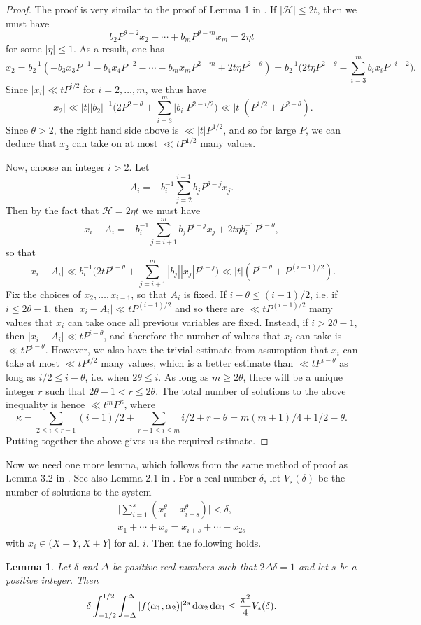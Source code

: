 \documentclass[11pt,reqno]{amsart}
\numberwithin{equation}{section}
\newtheorem{lemma}{Lemma}[section]
\renewcommand{\d}{\,{\rm d}}
\begin{document}
\begin{proof} The proof is very similar to the proof of Lemma 1 in \cite{ArkhZhit}. If $|\mathcal{H}| \leq 2t$, then we must have 
\[ b_2P^{\theta-2}x_2+\cdots+b_mP^{\theta-m}x_m = 2\eta t \]
for some $|\eta| \leq 1$. 
As a result, one has 
\[ x_2 = b_2^{-1}(-b_3x_3P^{-1}-b_4x_4P^{-2}-\cdots-b_mx_mP^{2-m}+2t\eta P^{2-\theta}) = b_2^{-1} \Big( 2t\eta P^{2-\theta} - \sum_{i=3}^m b_ix_iP^{-i+2} \Big). \]
Since $|x_i| \ll tP^{i/2}$ for $i = 2, \ldots, m$, we thus have 
\[ |x_2| \ll |t||b_2|^{-1} \Big( 2P^{2-\theta} + \sum_{i=3}^m |b_i|P^{2-i/2} \Big) \ll |t|(P^{1/2}+P^{2-\theta}). \]
Since $\theta > 2$, the right hand side above is $\ll |t|P^{1/2}$, and so for large $P$, we can deduce that $x_2$ can take on at most $\ll tP^{1/2}$ many values. 

Now, choose an integer $i > 2$. Let 
\[ A_i = -b_i^{-1}\sum_{j = 2}^{i-1} b_jP^{\theta-j}x_j. \]
Then by the fact that $\mathcal{H} = 2\eta t$ we must have 
\[ x_i - A_i = -b_i^{-1}\sum_{j=i+1}^m b_jP^{i-j}x_j +2t\eta b_i^{-1}P^{i-\theta}, \]
so that 
\[ |x_i - A_i| \ll b_i^{-1}\Big( 2tP^{i-\theta} + \sum_{j=i+1}^m |b_j||x_j|P^{i-j} \Big) \ll |t|(P^{i-\theta}+P^{(i-1)/2}). \]
Fix the choices of $x_2, \ldots, x_{i-1}$, so that $A_i$ is fixed. If $i- \theta \leq (i-1)/2$, i.e. if $i \leq 2\theta-1$, then $|x_i -A_i| \ll tP^{(i-1)/2}$ and so there are $\ll tP^{(i-1)/2}$ many values that $x_i$ can take once all previous variables are fixed. Instead, if $i > 2\theta-1$, then $|x_i-A_i| \ll tP^{i-\theta} $, and therefore the number of values that $x_i$ can take is $\ll tP^{i-\theta}$. However, we also have the trivial estimate from assumption that $x_i$ can take at most $\ll tP^{i/2}$ many values, which is a better estimate than $\ll tP^{i-\theta}$ as long as $i/2 \leq i-\theta$, i.e. when $2\theta \leq i$. As long as $m \geq 2\theta$, there will be a unique integer $r$ such that $2\theta-1 < r \leq 2\theta$. The total number of solutions to the above inequality is hence $\ll t^m P^{\kappa}$, where 
\[ \kappa = \sum_{2 \leq i \leq r-1} (i-1)/2+\sum_{r+1 \leq i \leq m} i/2 + r-\theta = m(m+1)/4+1/2 - \theta. \]
Putting together the above gives us the required estimate. 
\end{proof}


Now we need one more lemma, which follows from the same method of proof as Lemma 3.2 in \cite{Poulias1}. See also Lemma 2.1 in \cite{Watt}. For a real number $\delta$, let $V_s(\delta)$ be the number of solutions to the system 
\begin{align*} \Big|\sum_{i=1}^s (x_i^{\theta}-x_{i+s}^{\theta})\Big| < \delta, 
\\ 
x_1+\cdots+x_s = x_{i+s}+\cdots+x_{2s} 
\end{align*} 
with $x_i \in (X-Y,X+Y]$ for all $i$. Then the following holds. 
\begin{lemma} \label{lem:count}
Let $\delta$ and $\Delta$ be positive real numbers such that $2\Delta\delta = 1$ and let $s$ be a positive integer. Then 
\[ \delta \int_{-1/2}^{1/2} \int_{-\Delta}^{\Delta} |f(\alpha_1,\alpha_2)|^{2s} \d\alpha_2\d\alpha_1 \leq \frac{\pi^2}{4}V_s( \delta). \]
\end{lemma}
\end{document}

